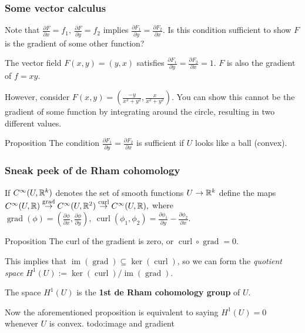 \documentclass[xcolor=dvipsnames]{beamer}
\begin{document}
    \begin{frame}
    \frametitle{Some vector calculus} 
    Note that $\frac{\partial F}{\partial x}=f_1,\ \frac{\partial F}{\partial y}=f_2$ implies $\frac{\partial F_1}{\partial y}=\frac{\partial F_2}{\partial x}$. Is this condition sufficient to show $F$ is the gradient of some other function?
    \begin{example}
        The vector field $F(x,y)=(y,x)$ satisfies $\frac{\partial F_1}{\partial y}= \frac{\partial F_2}{\partial x}=1$. $F$ is also the gradient of $f=xy$.
    \end{example}%
    \begin{example}
        However, consider $F(x,y)=\left( \frac{-y}{x^2+y^2},\frac{x}{x^2+y^2} \right) $. You can show this cannot be the gradient of some function by integrating around the circle, resulting in two different values.
    \end{example}\pause
    \begin{block}{Proposition} 
        The condition $\frac{\partial F_1}{\partial y}=\frac{\partial F_2}{\partial x}$ is sufficient if $U$ looks like a ball (convex). 
    \end{block}
    \end{frame}

    \begin{frame}
        \frametitle{Sneak peek of de Rham cohomology} 
        \begin{definition}
        If $C^{\infty}(U,\mathbb{R}^k)$ denotes the set of smooth functions $U \to \mathbb{R}^k$ define the maps $C^{\infty}(U,\mathbb{R}) \overset{\operatorname{grad}}{\to } C^{\infty}(U,\mathbb{R}^2) \overset{\operatorname{curl}}{\to } C^{\infty}(U,\mathbb{R}),$ where $\operatorname{grad}(\phi)=\left( \frac{\partial  \phi}{\partial x}, \frac{\partial \phi}{\partial y} \right) ,\ \operatorname{curl}(\phi_1,\phi_2)=\frac{\partial \phi_1}{\partial y}-\frac{\partial \phi_2}{\partial x} $.
        \end{definition}%
        \begin{block}{Proposition} 
           The curl of the gradient is zero, or $\operatorname{curl}\circ \operatorname{grad}=0$. 
        \end{block}\pause
        This implies that $\operatorname{im}(\operatorname{grad}) \subseteq \ker (\operatorname{curl})$, so we can form the \emph{quotient space} $H^1(U):= \ker (\operatorname{curl})/ \operatorname{im}(\operatorname{grad})$. 
       \begin{definition}
            The space $H^1(U)$ is the \textbf{1st de Rham cohomology group} of $U$.        
        \end{definition}
        Now the aforementioned proposition is equivalent to saying $H^1(U)=0$ whenever $U$ is convex. {\color{red}todo:image and gradient} 
    \end{frame}
\end{document}
